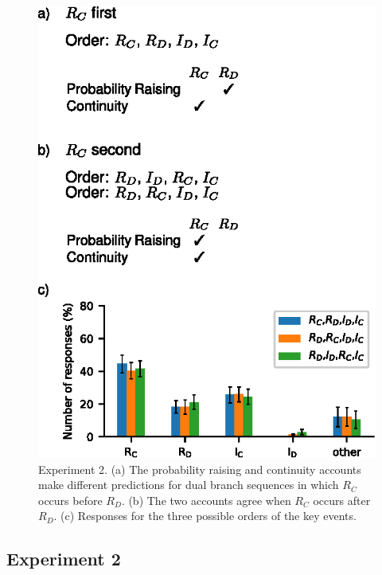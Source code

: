 \documentclass[10pt,letterpaper]{article}
\newcommand{\ev}[2]{$#1_#2$}
\begin{document}
\begin{figure}[t]
\begin{center}
\includegraphics{figures/expt2test.eps}
\end{center}
\caption{Experiment 2. (a) The probability raising and continuity accounts make different predictions for dual branch sequences in which \ev{R}{C} occurs before \ev{R}{D}. (b) The two accounts agree when \ev{R}{C} occurs after \ev{R}{D}.
(c) Responses for the three possible orders of the key events.} 
\label{fig:expt2}
\end{figure}



\subsection{Experiment 2}
\end{document}
